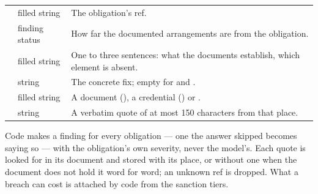 \par\nopagebreak
\begin{xltabular}{\textwidth}{@{}L{44mm}L{28mm}Y@{}}
\toprule
{} &  &  \\
\midrule
\endhead
\bottomrule
\endlastfoot
{} & filled string & The obligation's ref. \\
 & finding status & How far the documented arrangements are from the obligation. \\
 & filled string & One to three sentences: what the documents establish, which element is absent. \\
 & string & The concrete fix; empty for  and . \\
 & filled string & A document (), a credential () or . \\
 & string & A verbatim quote of at most 150 characters from that place. \\
\end{xltabular}

Code makes a finding for every obligation --- one the answer skipped becomes 
saying so --- with the obligation's own severity, never the model's. Each quote is looked for
in its document and stored with its place, or without one when the document does not hold it
word for word; an unknown ref is dropped. What a breach can cost is attached by code from the
sanction tiers.

